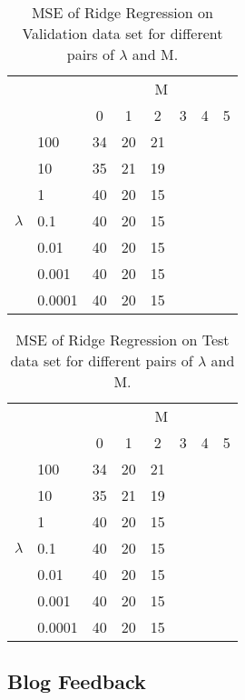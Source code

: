 \begin{table}[tb]
\centering
\begin{tabular}{ll|cccccc}
  & & \multicolumn{6}{c}{M} \\
  & & 0 & 1 & 2 & 3 & 4 & 5 \\
  \hline
  \multirow{7}{*}{$\lambda$} & 100 & 34 & 20 & 21\\
  & 10 & 35 & 21 & 19\\
  & 1 & 40 & 20 & 15\\
  & 0.1 & 40 & 20 & 15\\
  & 0.01 & 40 & 20 & 15\\
  & 0.001 & 40 & 20 & 15\\
  & 0.0001 & 40 & 20 & 15\\
\end{tabular}
\caption{MSE of Ridge Regression on Validation data set for different pairs of $\lambda$ and M.}\label{tab:ridge_cv}
\end{table}

\begin{table}[tb]
\centering
\begin{tabular}{ll|cccccc}
  & & \multicolumn{6}{c}{M} \\
  & & 0 & 1 & 2 & 3 & 4 & 5 \\
  \hline
  \multirow{7}{*}{$\lambda$} & 100 & 34 & 20 & 21\\
  & 10 & 35 & 21 & 19\\
  & 1 & 40 & 20 & 15\\
  & 0.1 & 40 & 20 & 15\\
  & 0.01 & 40 & 20 & 15\\
  & 0.001 & 40 & 20 & 15\\
  & 0.0001 & 40 & 20 & 15\\
\end{tabular}
\caption{MSE of Ridge Regression on Test data set for different pairs of $\lambda$ and M.}\label{tab:ridge_cv}
\end{table}


\subsection{Blog Feedback}